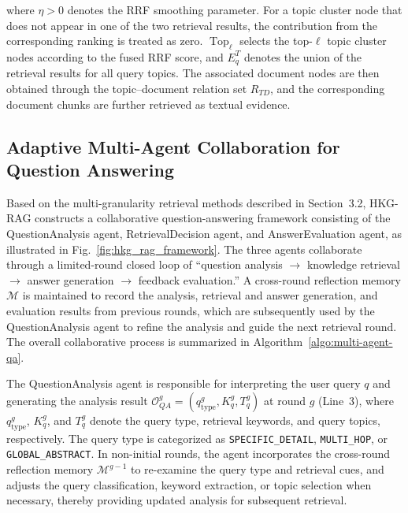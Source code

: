 \documentclass[preprint,12pt,authoryear]{elsarticle}
\begin{document}
where $\eta>0$ denotes the RRF smoothing parameter. For a topic cluster node that does not appear in one of the two retrieval results, the contribution from the corresponding ranking is treated as zero. $\operatorname{Top}_{\ell}$ selects the top-$\ell$ topic cluster nodes according to the fused RRF score, and $E_q^T$ denotes the union of the retrieval results for all query topics. The associated document nodes are then obtained through the topic--document relation set $R_{TD}$, and the corresponding document chunks are further retrieved as textual evidence.


\subsection{Adaptive Multi-Agent Collaboration for Question Answering}
\label{subsec:multi-agent-qa}

Based on the multi-granularity retrieval methods described in Section~3.2, HKG-RAG constructs a collaborative question-answering framework consisting of the QuestionAnalysis agent, RetrievalDecision agent, and AnswerEvaluation agent, as illustrated in Fig.~\ref{fig:hkg_rag_framework}. The three agents collaborate through a limited-round closed loop of ``question analysis $\rightarrow$ knowledge retrieval $\rightarrow$ answer generation $\rightarrow$ feedback evaluation.'' A cross-round reflection memory $\mathcal{M}$ is maintained to record the analysis, retrieval and answer generation, and evaluation results from previous rounds, which are subsequently used by the QuestionAnalysis agent to refine the analysis and guide the next retrieval round. The overall collaborative process is summarized in Algorithm~\ref{algo:multi-agent-qa}.


The QuestionAnalysis agent is responsible for interpreting the user query $q$ and generating the analysis result $\mathcal{O}_{QA}^{g}=(q_{\mathrm{type}}^{g},K_q^{g},T_q^{g})$ at round $g$ (Line~3), where $q_{\mathrm{type}}^{g}$, $K_q^{g}$, and $T_q^{g}$ denote the query type, retrieval keywords, and query topics, respectively. The query type is categorized as \texttt{SPECIFIC\_DETAIL}, \texttt{MULTI\_HOP}, or \texttt{GLOBAL\_ABSTRACT}. In non-initial rounds, the agent incorporates the cross-round reflection memory $\mathcal{M}^{g-1}$ to re-examine the query type and retrieval cues, and adjusts the query classification, keyword extraction, or topic selection when necessary, thereby providing updated analysis for subsequent retrieval.
\end{document}
